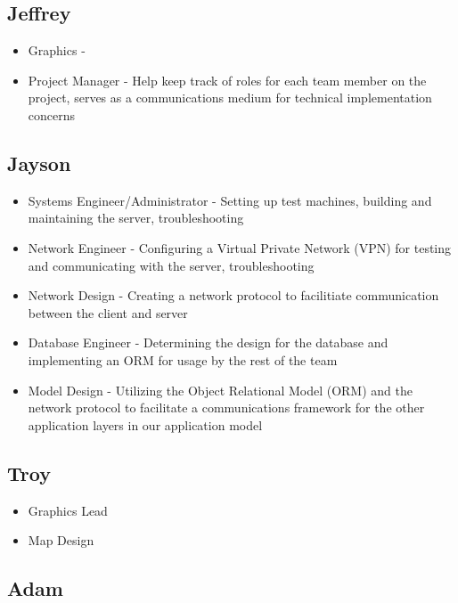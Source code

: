 \documentclass[12pt, a4paper, oneside]{article}
\begin{document}
\subsection*{Jeffrey}

\begin{itemize}
  \item Graphics - 
  \item Project Manager - Help keep track of roles for each team member on the project, serves as a communications medium for technical implementation concerns
\end{itemize}

\subsection*{Jayson}

\begin{itemize}
  \item Systems Engineer/Administrator - Setting up test machines, building and maintaining the server, troubleshooting
  \item Network Engineer - Configuring a Virtual Private Network (VPN) for testing and communicating with the server, troubleshooting
  \item Network Design - Creating a network protocol to facilitiate communication between the client and server
  \item Database Engineer - Determining the design for the database and implementing an ORM for usage by the rest of the team
  \item Model Design - Utilizing the Object Relational Model (ORM) and the network protocol to facilitate a communications framework for the other application layers in our application model  
\end{itemize}

\subsection*{Troy}

\begin{itemize}
  \item Graphics Lead
  \item Map Design 
\end{itemize}

\subsection*{Adam}
\end{document}
